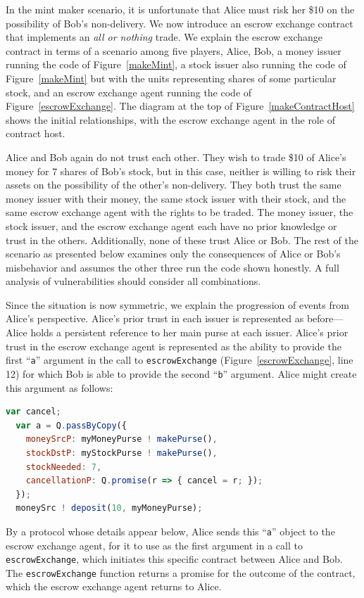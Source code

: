 \documentclass{llncs}
\begin{document}
In the mint maker scenario, it is unfortunate that Alice must risk her \$10 on the possibility of Bob's non-delivery. We now introduce an escrow exchange contract that implements an \emph{all or nothing} trade. We explain the escrow exchange contract in terms of a scenario among five players, Alice, Bob, a money issuer running the code of Figure~\ref{makeMint}, a stock issuer also running the code of Figure~\ref{makeMint} but with the units representing shares of some particular stock, and an escrow exchange agent running the code of Figure~\ref{escrowExchange}. The diagram at the top of Figure~\ref{makeContractHost} shows the initial relationships, with the escrow exchange agent in the role of contract host.

Alice and Bob again do not trust each other. They wish to trade \$10 of Alice's money for 7 shares of Bob's stock, but in this case, neither is willing to risk their assets on the possibility of the other's non-delivery. They both trust the same money issuer with their money, the same stock issuer with their stock, and the same escrow exchange agent with the rights to be traded. The money issuer, the stock issuer, and the escrow exchange agent each have no prior knowledge or trust in the others. Additionally, none of these trust Alice or Bob. The rest of the scenario as presented below examines only the consequences of Alice or Bob's misbehavior and assumes the other three run the code shown honestly. A full analysis of vulnerabilities should consider all combinations.

Since the situation is now symmetric, we explain the progression of events from Alice's perspective. Alice's prior trust in each issuer is represented as before---Alice holds a persistent reference to her main purse at each issuer. Alice's prior trust in the escrow exchange agent is represented as the ability to provide the first ``{\tt a}'' argument in the call to {\tt escrowExchange} (Figure~\ref{escrowExchange}, line 12) for which Bob is able to provide the second ``{\tt b}'' argument. Alice might create this argument as follows:

\begin{lstlisting}[language=JavaScript,numbers=none]
  var cancel;
  var a = Q.passByCopy({
    moneySrcP: myMoneyPurse ! makePurse(),
    stockDstP: myStockPurse ! makePurse(),
    stockNeeded: 7,
    cancellationP: Q.promise(r => { cancel = r; });
  });
  moneySrc ! deposit(10, myMoneyPurse);
\end{lstlisting}

By a protocol whose details appear below, Alice sends this ``{\tt a}'' object to the escrow exchange agent, for it to use as the first argument in a call to {\tt escrowExchange}, which initiates this specific contract between Alice and Bob. The {\tt escrowExchange} function returns a promise for the outcome of the contract, which the escrow exchange agent returns to Alice. 
\end{document}
